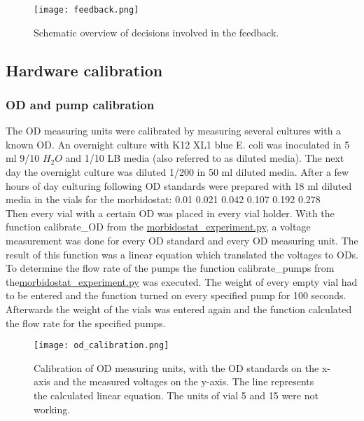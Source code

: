 \begin{figure}
	\texttt{[image: feedback.png]}
	\caption{Schematic overview of decisions involved in the feedback.}
	\label{figure:feedback}
\end{figure}

\subsection{Hardware calibration}
\subsubsection{OD and pump calibration}
The OD measuring units were calibrated by measuring several cultures with a known OD.
An overnight culture with K12 XL1 blue E. coli was inoculated in 5 ml 9/10 $H_2O$ and 1/10 LB media (also referred to as diluted media). The next day the overnight culture was diluted 1/200 in 50 ml diluted media. After a few hours of day culturing following OD standards were prepared with 18 ml diluted media in the vials for the morbidostat: 0.01 0.021 0.042 0.107 0.192 0.278\\
Then every vial with a certain OD was placed in every vial holder. With the function calibrate\_OD from the \href{https://github.com/nahanoo/ESBL\_project/}{morbidostat\_experiment.py}, a voltage measurement was done for every OD standard and every OD measuring unit. The result of this function was a linear equation which translated the voltages to ODs. \\
To determine the flow rate of the pumps the function calibrate\_pumps from the\href{https://github.com/nahanoo/ESBL\_project/}{morbidostat\_experiment.py} was executed. The weight of every empty vial had to be entered and the function turned on every specified pump for 100 seconds. Afterwards the weight of the vials was entered again and the function calculated the flow rate for the specified pumps.\begin{figure}
	\texttt{[image: od\_calibration.png]}
	\caption{Calibration of OD measuring units, with the OD standards on the x-axis and the measured voltages on the y-axis. The line represents the calculated linear equation. The units of vial 5 and 15 were not working.}
\end{figure}
 
\label{section:OD_calibration}

